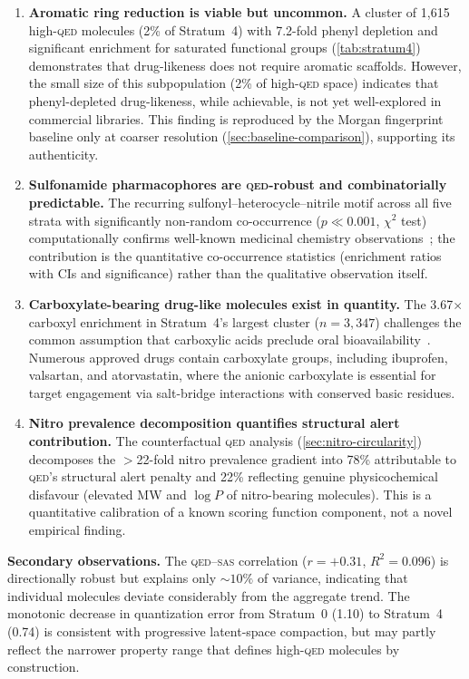 \documentclass[10pt,a4paper,twocolumn]{article}
\providecommand{\qed}{}
\let\qed\relax
\newcommand{\qedscore}{\textsc{qed}}
\let\qed\qedscore
\newcommand{\sas}{\textsc{sas}}
\newcommand{\logp}{\ensuremath{\log P}}
\begin{document}
\begin{enumerate}
    \item \textbf{Aromatic ring reduction is viable but uncommon.} A cluster of 1,615 high-\qed{} molecules (2\% of Stratum~4) with 7.2-fold phenyl depletion and significant enrichment for saturated functional groups (\cref{tab:stratum4}) demonstrates that drug-likeness does not require aromatic scaffolds. However, the small size of this subpopulation (2\% of high-\qed{} space) indicates that phenyl-depleted drug-likeness, while achievable, is not yet well-explored in commercial libraries. This finding is reproduced by the Morgan fingerprint baseline only at coarser resolution (\cref{sec:baseline-comparison}), supporting its authenticity.
    \item \textbf{Sulfonamide pharmacophores are \qed{}-robust and combinatorially predictable.} The recurring sulfonyl--heterocycle--nitrile motif across all five strata with significantly non-random co-occurrence ($p \ll 0.001$, $\chi^2$ test) computationally confirms well-known medicinal chemistry observations~\cite{roskoski2016,supuran2017}; the contribution is the quantitative co-occurrence statistics (enrichment ratios with CIs and significance) rather than the qualitative observation itself.
    \item \textbf{Carboxylate-bearing drug-like molecules exist in quantity.} The 3.67$\times$ carboxyl enrichment in Stratum~4's largest cluster ($n = 3{,}347$) challenges the common assumption that carboxylic acids preclude oral bioavailability~\cite{ballatore2013}. Numerous approved drugs contain carboxylate groups, including ibuprofen, valsartan, and atorvastatin, where the anionic carboxylate is essential for target engagement via salt-bridge interactions with conserved basic residues.
    \item \textbf{Nitro prevalence decomposition quantifies structural alert contribution.} The counterfactual \qed{} analysis (\cref{sec:nitro-circularity}) decomposes the $>$22-fold nitro prevalence gradient into 78\% attributable to \qed{}'s structural alert penalty and 22\% reflecting genuine physicochemical disfavour (elevated MW and $\logp{}$ of nitro-bearing molecules). This is a quantitative calibration of a known scoring function component, not a novel empirical finding.
\end{enumerate}

\textbf{Secondary observations.} The \qed{}--\sas{} correlation ($r = +0.31$, $R^2 = 0.096$) is directionally robust but explains only ${\sim}10\%$ of variance, indicating that individual molecules deviate considerably from the aggregate trend. The monotonic decrease in quantization error from Stratum~0 (1.10) to Stratum~4 (0.74) is consistent with progressive latent-space compaction, but may partly reflect the narrower property range that defines high-\qed{} molecules by construction.
\end{document}
